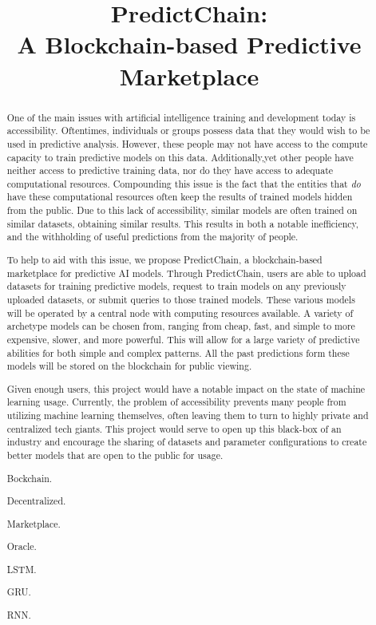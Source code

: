 \documentclass{ledger}
\title{PredictChain:\\
A Blockchain-based Predictive Marketplace}
\begin{document}
\maketitle

\thispagestyle{pagefirst}

\begin{abstract}
One of the main issues with artificial intelligence training and development today is accessibility. Oftentimes,
individuals or groups possess data that they would wish to be used in predictive analysis. However, these people
may not have access to the compute capacity to train predictive models on this data.  Additionally,yet other
people have neither access to predictive training data, nor do they have access to adequate computational resources.
Compounding this issue is the fact that the entities that \textit{do} have these computational resources often keep the
results of trained models hidden from the public.  Due to this lack of accessibility, similar models are often trained
on similar datasets, obtaining similar results.  This results in both a notable inefficiency, and the withholding of
useful predictions from the majority of people.

\quad To help to aid with this issue, we propose PredictChain, a blockchain-based marketplace for predictive AI models.
Through PredictChain, users are able to upload datasets for training predictive models, request to train models on any
previously uploaded datasets, or submit queries to those trained models.  These various models will be operated by a
central node with computing resources available. A variety of archetype models can be chosen from, ranging from cheap,
fast, and simple to more expensive, slower, and more powerful.  This will allow for a large variety of predictive
abilities for both simple and complex patterns.  All the past predictions form these models will be stored on the
blockchain for public viewing.

\quad Given enough users, this project would have a notable impact on the state of machine learning usage.  Currently,
the problem of accessibility prevents many people from utilizing machine learning themselves, often leaving them to
turn to highly private and centralized tech giants.  This project would serve to open up this black-box of
an industry and encourage the sharing of datasets and parameter configurations to create better models that are open
to the public for usage.

\begin{keywords}
\item Bockchain.
\item Decentralized.
\item Marketplace.
\item Oracle.
\item LSTM.
\item GRU.
\item RNN.
\end{keywords}
\end{abstract}
\end{document}
